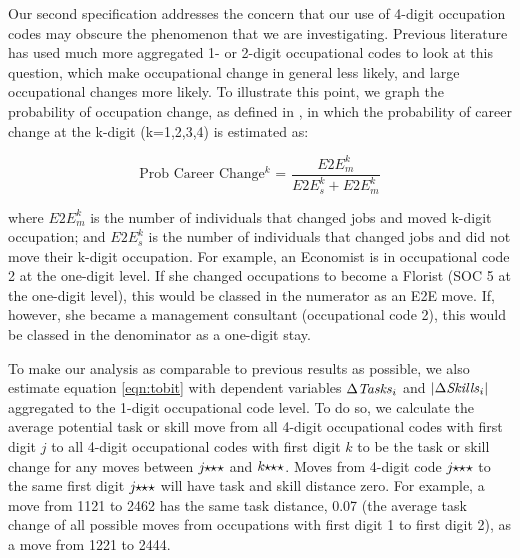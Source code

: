 \documentclass[preprint,12pt,authoryear]{elsarticle}
\begin{document}
Our second specification addresses the concern that our use of 4-digit occupation codes may obscure the phenomenon that we are investigating. Previous literature has used much more aggregated 1- or 2-digit occupational codes to look at this question, which make occupational change in general less likely, and large occupational changes more likely. To illustrate this point, we graph the probability of occupation change, as defined in \cite{Carrillo-Tudela2016}, in which the probability of career change at the k-digit (k=1,2,3,4) is estimated as:

\begin{equation*}
\text{Prob Career Change$^{k}$ = } \frac{E2E^{k}_m}{E2E^{k}_s + E2E^{k}_m}
\end{equation*}

\noindent where $E2E^{k}_m$ is the number of individuals that changed jobs and moved k-digit occupation; and $E2E^{k}_s$ is the number of individuals that changed jobs and did not move their k-digit occupation. For example, an Economist is in occupational code 2 at the one-digit level. If she changed occupations to become a Florist (SOC 5 at the one-digit level), this would be classed in the numerator as an E2E move. If, however, she became a management consultant (occupational code 2), this would be classed in the denominator as a one-digit stay.



To make our analysis as comparable to previous results as possible, we also estimate equation \ref{eqn:tobit} with dependent variables  $\Delta\text{\textit{Tasks}}_{i}$ and $|\Delta\text{\textit{Skills}}_{i}|$ aggregated to the 1-digit occupational code level. To do so, we calculate the average potential task or skill move from all 4-digit occupational codes with first digit $j$ to all 4-digit occupational codes with first digit $k$ to be the task or skill change for any moves between $j\hspace{-1mm}\star\hspace{-1mm}\star\star$ and $k\hspace{-1mm}\star\hspace{-1mm}\star\star$. Moves from 4-digit code $j\hspace{-1mm}\star\hspace{-1mm}\star\star$ to the same first digit $j\hspace{-1mm}\star\hspace{-1mm}\star\star$ will have task and skill distance zero. For example, a move from 1121 to 2462 has the same task distance, 0.07 (the average task change of all possible moves from occupations with first digit 1 to first digit 2), as a move from 1221 to 2444.
\end{document}
